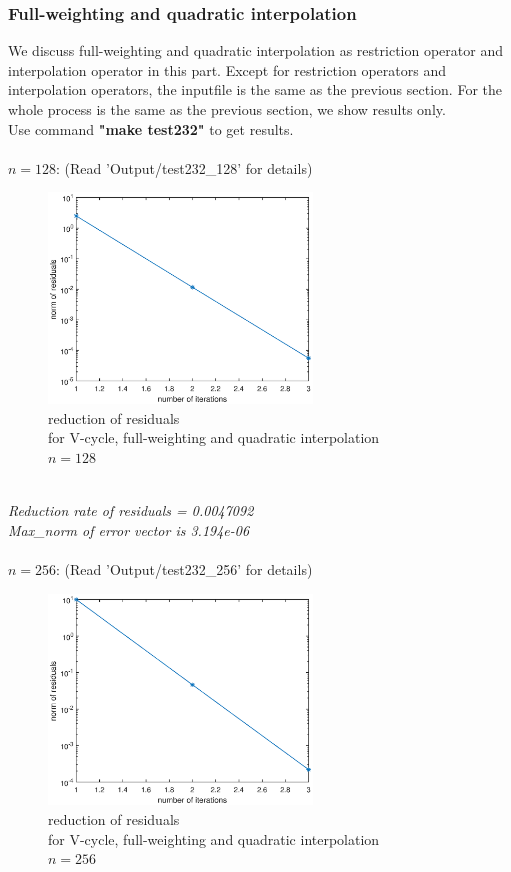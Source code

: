 \documentclass[a4paper,twocolumn]{article}
\theoremstyle{definition}
\begin{document}
\subsubsection{Full-weighting and quadratic interpolation}
We discuss full-weighting and quadratic interpolation as restriction operator and interpolation operator in this part.  Except for restriction operators and interpolation operators, the inputfile is the same as the previous section. For the whole process is the same as the previous section, we show results only. \\
Use command \textbf{"make test232"} to get results. \\\\
$n=128$: (Read 'Output/test232\_128' for details)
\begin{figure}[!htp]   
	\centering
	\includegraphics[width=7cm]{Pictures/F232_1.eps}
	\caption{reduction of residuals \\for V-cycle, full-weighting and quadratic interpolation\\ $n = 128$}
\end{figure}\\
\emph{Reduction rate of residuals = 0.0047092}\\
\emph{Max\_norm of error vector is 3.194e-06}\\\\
$n=256$: (Read 'Output/test232\_256' for details)
\begin{figure}[!htp]   
	\centering
	\includegraphics[width=7cm]{Pictures/F232_2.eps}
	\caption{reduction of residuals \\for V-cycle, full-weighting and quadratic interpolation\\ $n = 256$}
\end{figure}\\
\end{document}
